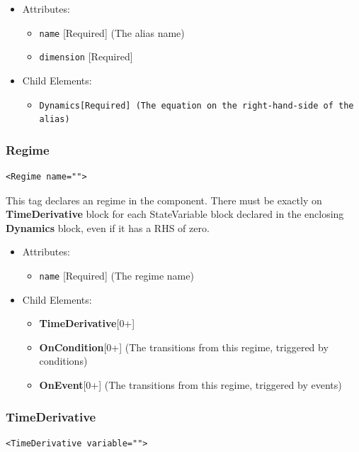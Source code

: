\documentclass{article}
\newcommand{\Dynamics}{{\bf{Dynamics}}\xspace}
\newcommand{\MathInline}{\tt{Dynamics}}
\newcommand{\TimeDerivative}{{\bf{TimeDerivative}}\xspace}
\newcommand{\OnEvent}{{\bf{OnEvent}}\xspace}
\newcommand{\OnCondition}{{\bf{OnCondition}}\xspace}
\begin{document}
\begin{itemize}
\item Attributes:
\begin{itemize}
\item \verb|name| {[}Required{]} (The alias name)
\item \verb|dimension| {[}Required{]}
\end{itemize}

\item Child Elements:
\begin{itemize}
\item \MathInline {[}Required{]} (The equation on the right-hand-side of the
alias)
\end{itemize}
\end{itemize}

\subsubsection{Regime}
%
\begin{lstlisting}
<Regime name="">
\end{lstlisting}

This tag declares an regime in the component. There must be exactly on
\TimeDerivative block for each StateVariable block declared in the
enclosing \Dynamics block, even if it has a RHS of zero.

\begin{itemize}
\item Attributes:
\begin{itemize}
\item \verb|name| {[}Required{]} (The regime name)
\end{itemize}

\item Child Elements:
\begin{itemize}
\item \TimeDerivative {[}0+{]}
\item \OnCondition {[}0+{]} (The transitions from this regime, triggered by
conditions)
\item \OnEvent {[}0+{]} (The transitions from this regime, triggered by events)
\end{itemize}

\end{itemize}

\subsubsection{TimeDerivative}
%
\begin{lstlisting}
<TimeDerivative variable="">
\end{lstlisting}
\end{document}

